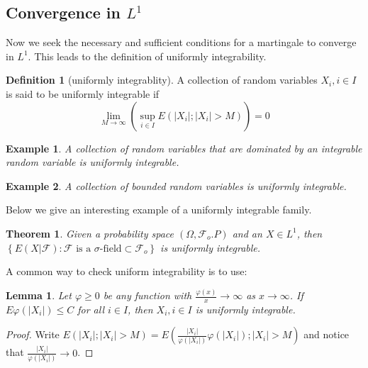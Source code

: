 \documentclass{article}
\newtheorem{Thm}{Theorem}[section]
\newtheorem{Lem}{Lemma}[section]
\newtheorem{Eg}{Example}[section]
\theoremstyle{definition}
\newtheorem{Def}{Definition}[section]
\begin{document}
\subsection{Convergence in $L^1$}
Now we seek the necessary and sufficient conditions for a martingale to converge in $L^1$. This leads to the definition of uniformly integrability.
\begin{Def}[uniformly integrablity]
A collection of random variables $X_i,i\in I$ is said to be uniformly integrable if 
\[\lim_{M\to\infty}(\sup_{i\in I}E(\left|X_i\right|;\left|X_i\right|>M))=0\]
\end{Def}
\begin{Eg}
    A collection of random variables that are dominated by an integrable random variable is uniformly integrable.
\end{Eg}
\begin{Eg}
    A collection of bounded random variables is uniformly integrable.
\end{Eg}
Below we give an interesting example of a uniformly integrable family.
\begin{Thm}
Given a probability space $(\Omega,\mathcal{F}_o.P)$ and an $X\in L^1$, then $\left\{E(X|\mathcal{F}):\mathcal{F}\text{ is a }\sigma\text{-field}\subset\mathcal{F}_o\right\}$ is uniformly integrable.
\end{Thm}

A common way to check uniform integrability is to use:
\begin{Lem}
Let $\varphi\ge 0$ be any function with $\frac{\varphi(x)}{x}\to\infty$ as $x\to\infty$. If $E\varphi(\left|X_i\right|)\le C$ for all $i\in I$, then $X_i,i\in I$ is uniformly integrable.
\end{Lem}
\begin{proof}
    Write $E(\left|X_i\right|;\left|X_i\right|>M)=E(\frac{\left|X_i\right|}{\varphi(\left|X_i\right|)}\varphi(\left|X_i\right|);\left|X_i\right|>M)$ and notice that $\frac{\left|X_i\right|}{\varphi(\left|X_i\right|)}\to 0$.
\end{proof}
\end{document}
